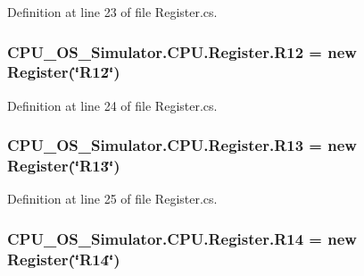 Definition at line 23 of file Register.\+cs.

\hypertarget{class_c_p_u___o_s___simulator_1_1_c_p_u_1_1_register_abb2b38dad72e0b3e97fcf7e09a0bf1f9}{}
\subsubsection[{R12}]{ C\+P\+U\+\_\+\+O\+S\+\_\+\+Simulator.\+C\+P\+U.\+Register.\+R12 = new {\bf Register}(\char`\"{}R12\char`\"{})\hspace{0.3cm}{\ttfamily [static]}}\label{class_c_p_u___o_s___simulator_1_1_c_p_u_1_1_register_abb2b38dad72e0b3e97fcf7e09a0bf1f9}


Definition at line 24 of file Register.\+cs.

\hypertarget{class_c_p_u___o_s___simulator_1_1_c_p_u_1_1_register_adb4ed15863b50ae94a10416d9fc35a34}{}
\subsubsection[{R13}]{ C\+P\+U\+\_\+\+O\+S\+\_\+\+Simulator.\+C\+P\+U.\+Register.\+R13 = new {\bf Register}(\char`\"{}R13\char`\"{})\hspace{0.3cm}{\ttfamily [static]}}\label{class_c_p_u___o_s___simulator_1_1_c_p_u_1_1_register_adb4ed15863b50ae94a10416d9fc35a34}


Definition at line 25 of file Register.\+cs.

\hypertarget{class_c_p_u___o_s___simulator_1_1_c_p_u_1_1_register_ad2c93dc9788349569aac3a5ba60f7581}{}
\subsubsection[{R14}]{ C\+P\+U\+\_\+\+O\+S\+\_\+\+Simulator.\+C\+P\+U.\+Register.\+R14 = new {\bf Register}(\char`\"{}R14\char`\"{})\hspace{0.3cm}{\ttfamily [static]}}\label{class_c_p_u___o_s___simulator_1_1_c_p_u_1_1_register_ad2c93dc9788349569aac3a5ba60f7581}


